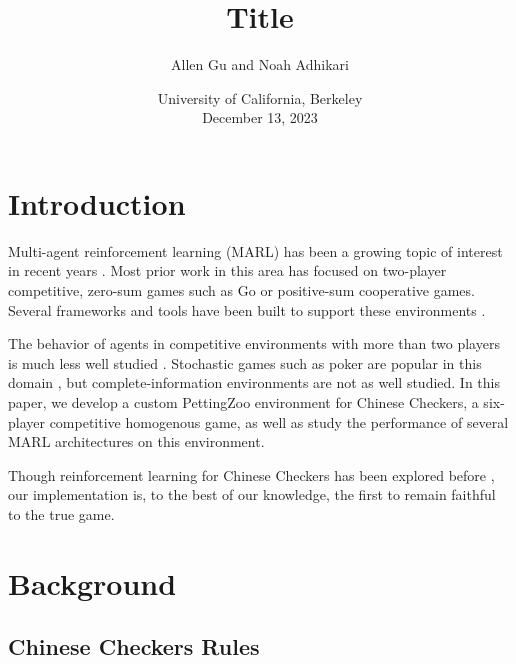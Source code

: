 \documentclass[12pt, a4paper, twocolumn]{article}
\title{Title}
\author{Allen Gu and Noah Adhikari}
\date{
    University of California, Berkeley\\[2ex] %
    December 13, 2023    
}
\newcommand{\abstractText}{\noindent
Abstract goes here.
}
\begin{document}

\twocolumn[
  \begin{@twocolumnfalse}
    \maketitle
    \begin{abstract}
      \abstractText
      \newline
      \newline
    \end{abstract}
  \end{@twocolumnfalse}
]


\section{Introduction}

Multi-agent reinforcement learning (MARL) has been a growing topic of interest in recent years \cite{ArticleReference1}. Most prior work in this area has focused on two-player competitive, zero-sum games such as Go \cite{ArticleReference2} or positive-sum cooperative games\cite{ArticleReference3}. Several frameworks and tools have been built to support these environments \cite{PettingZoo} \cite{Gym}. 

The behavior of agents in competitive environments with more than two players is much less well studied \cite{ArticleReference4}. Stochastic games such as poker are popular in this domain \cite{ArticleReference5}, but complete-information environments are not as well studied. In this paper, we develop a custom PettingZoo environment for Chinese Checkers, a six-player competitive homogenous game, as well as study the performance of several MARL architectures on this environment.


Though reinforcement learning for Chinese Checkers has been explored before \cite{ArticleReference6}, our implementation is, to the best of our knowledge, the first to remain faithful to the true game.

\section{Background}

\subsection{Chinese Checkers Rules}
\end{document}
